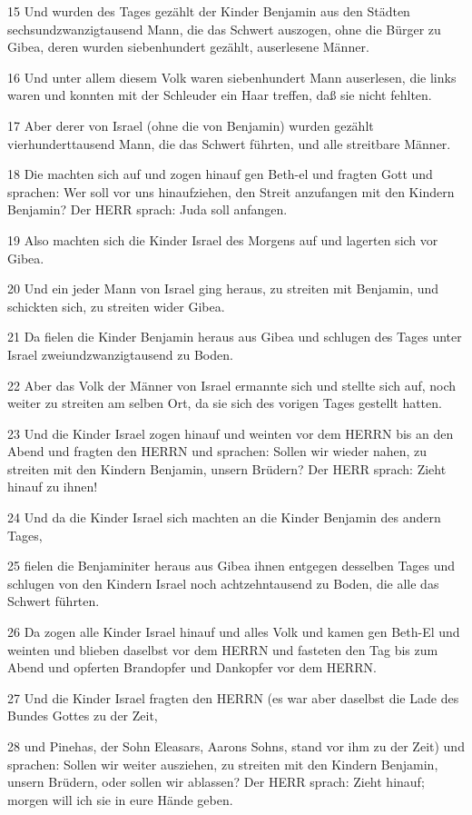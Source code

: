 \par 15 Und wurden des Tages gezählt der Kinder Benjamin aus den Städten sechsundzwanzigtausend Mann, die das Schwert auszogen, ohne die Bürger zu Gibea, deren wurden siebenhundert gezählt, auserlesene Männer.
\par 16 Und unter allem diesem Volk waren siebenhundert Mann auserlesen, die links waren und konnten mit der Schleuder ein Haar treffen, daß sie nicht fehlten.
\par 17 Aber derer von Israel (ohne die von Benjamin) wurden gezählt vierhunderttausend Mann, die das Schwert führten, und alle streitbare Männer.
\par 18 Die machten sich auf und zogen hinauf gen Beth-el und fragten Gott und sprachen: Wer soll vor uns hinaufziehen, den Streit anzufangen mit den Kindern Benjamin? Der HERR sprach: Juda soll anfangen.
\par 19 Also machten sich die Kinder Israel des Morgens auf und lagerten sich vor Gibea.
\par 20 Und ein jeder Mann von Israel ging heraus, zu streiten mit Benjamin, und schickten sich, zu streiten wider Gibea.
\par 21 Da fielen die Kinder Benjamin heraus aus Gibea und schlugen des Tages unter Israel zweiundzwanzigtausend zu Boden.
\par 22 Aber das Volk der Männer von Israel ermannte sich und stellte sich auf, noch weiter zu streiten am selben Ort, da sie sich des vorigen Tages gestellt hatten.
\par 23 Und die Kinder Israel zogen hinauf und weinten vor dem HERRN bis an den Abend und fragten den HERRN und sprachen: Sollen wir wieder nahen, zu streiten mit den Kindern Benjamin, unsern Brüdern? Der HERR sprach: Zieht hinauf zu ihnen!
\par 24 Und da die Kinder Israel sich machten an die Kinder Benjamin des andern Tages,
\par 25 fielen die Benjaminiter heraus aus Gibea ihnen entgegen desselben Tages und schlugen von den Kindern Israel noch achtzehntausend zu Boden, die alle das Schwert führten.
\par 26 Da zogen alle Kinder Israel hinauf und alles Volk und kamen gen Beth-El und weinten und blieben daselbst vor dem HERRN und fasteten den Tag bis zum Abend und opferten Brandopfer und Dankopfer vor dem HERRN.
\par 27 Und die Kinder Israel fragten den HERRN (es war aber daselbst die Lade des Bundes Gottes zu der Zeit,
\par 28 und Pinehas, der Sohn Eleasars, Aarons Sohns, stand vor ihm zu der Zeit) und sprachen: Sollen wir weiter ausziehen, zu streiten mit den Kindern Benjamin, unsern Brüdern, oder sollen wir ablassen? Der HERR sprach: Zieht hinauf; morgen will ich sie in eure Hände geben.
